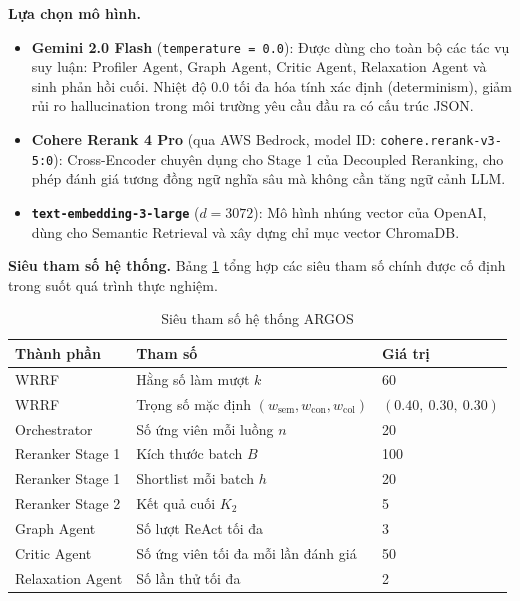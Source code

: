 \textbf{Lựa chọn mô hình.}
\begin{itemize}
    \item \textbf{Gemini 2.0 Flash} (\texttt{temperature = 0.0}): Được dùng cho toàn bộ các tác vụ suy luận: Profiler Agent, Graph Agent, Critic Agent, Relaxation Agent và sinh phản hồi cuối. Nhiệt độ $0.0$ tối đa hóa tính xác định (determinism), giảm rủi ro hallucination trong môi trường yêu cầu đầu ra có cấu trúc JSON.
    \item \textbf{Cohere Rerank 4 Pro} (qua AWS Bedrock, model ID: \texttt{cohere.rerank-v3-5:0}): Cross-Encoder chuyên dụng cho Stage 1 của Decoupled Reranking, cho phép đánh giá tương đồng ngữ nghĩa sâu mà không cần tăng ngữ cảnh LLM.
    \item \textbf{\texttt{text-embedding-3-large}} ($d = 3072$): Mô hình nhúng vector của OpenAI, dùng cho Semantic Retrieval và xây dựng chỉ mục vector ChromaDB.
\end{itemize}

\textbf{Siêu tham số hệ thống.}
Bảng \ref{tab:hyperparams} tổng hợp các siêu tham số chính được cố định trong suốt quá trình thực nghiệm.

\begin{table}[H]
    \caption{Siêu tham số hệ thống ARGOS}
    \label{tab:hyperparams}
    \centering
    \begin{tabular}{lll}
        \toprule
        \textbf{Thành phần} & \textbf{Tham số} & \textbf{Giá trị} \\
        \midrule
        WRRF & Hằng số làm mượt $k$ & 60 \\
        WRRF & Trọng số mặc định $(w_{\text{sem}}, w_{\text{con}}, w_{\text{col}})$ & $(0.40,\ 0.30,\ 0.30)$ \\
        Orchestrator & Số ứng viên mỗi luồng $n$ & 20 \\
        Reranker Stage 1 & Kích thước batch $B$ & 100 \\
        Reranker Stage 1 & Shortlist mỗi batch $h$ & 20 \\
        Reranker Stage 2 & Kết quả cuối $K_2$ & 5 \\
        Graph Agent & Số lượt ReAct tối đa & 3 \\
        Critic Agent & Số ứng viên tối đa mỗi lần đánh giá & 50 \\
        Relaxation Agent & Số lần thử tối đa & 2 \\
        \bottomrule
    \end{tabular}
\end{table}


